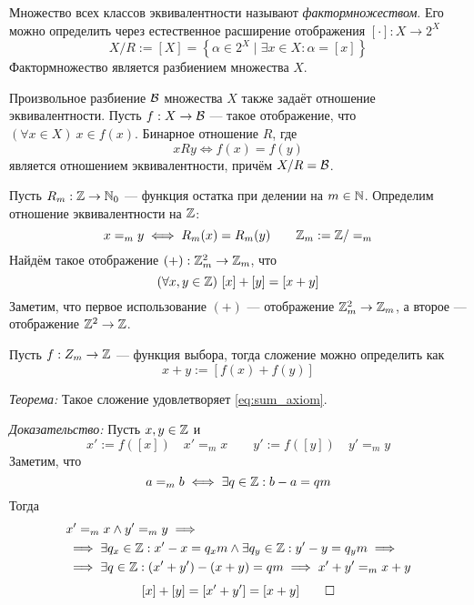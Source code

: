 Множество всех классов эквивалентности называют
{\it фактормножеством}.
Его можно определить через естественное
расширение отображения $[\cdot]:X\to 2^{X}$
\[
  X/R:=[X]=\left\{\alpha\in 2^{X}\;\big|\; \exists x\in X:\alpha=[x]\right\}
\]
Фактормножество является разбиением множества $X$.

Произвольное разбиение $\mathcal B$ множества $X$ также задаёт
отношение эквивалентности. Пусть $f:X\to \mathcal B$ --- такое отображение,
что $(\forall x\in X)~x\in f(x)$. Бинарное отношение $R$, где
\[
  xRy\iff f(x)=f(y)
\]
является отношением эквивалентности, причём $X/R=\mathcal B$.

Пусть $R_{m}:\mathbb Z\to\mathbb N_0$ --- функция остатка при делении на $m\in\mathbb N$.
% 
Определим отношение эквивалентности на $\mathbb Z$:
\[
  x=_{m}y\iff R_{m}(x)=R_{m}(y)\qquad \mathbb Z_{m}:=\mathbb Z/=_{m}
\]
Найдём такое отображение $(+):\mathbb Z^{2}_{m}\to\mathbb Z_{m}$, что
\begin{equation}\label{eq:sum_axiom}
  (\forall x,y\in\mathbb Z)~[x]+[y]=[x+y]
\end{equation}
Заметим, что первое использование $(+)$ --- отображение $\mathbb Z_{m}^{2}\to \mathbb Z_{m}$,
а второе --- отображение $\mathbb Z^{2}\to\mathbb Z$.

Пусть $f:Z_{m}\to \mathbb Z$ --- функция выбора, тогда сложение можно
определить как
\[
  x+y:=[f(x)+f(y)]
\]

\vspace{1em}
{\it Теорема:}
Такое сложение удовлетворяет \eqref{eq:sum_axiom}.

{\it Доказательство:}
Пусть $x,y\in \mathbb Z$ и
\[
  x':=f([x])\quad x'=_{m}x\qquad y':=f([y])\quad y'=_{m}y
\]
Заметим, что
\[
  a=_{m}b\iff \exists q\in\mathbb Z:b-a=qm
\]
Тогда
\[
  \begin{aligned}
     & x'=_{m}x\land y'=_{m}y\implies                                 \\
     & \implies \exists q_{x}\in\mathbb Z:x'-x=q_{x}m\land
    \exists q_{y}\in\mathbb Z:y'-y=q_{y}m\implies                            \\
     & \implies \exists q\in\mathbb Z:(x'+y')-(x+y)=qm\implies x'+y'=_{m}x+y
  \end{aligned}
\]
\[
  [x]+[y]=[x'+y']=[x+y]\qed
\]


